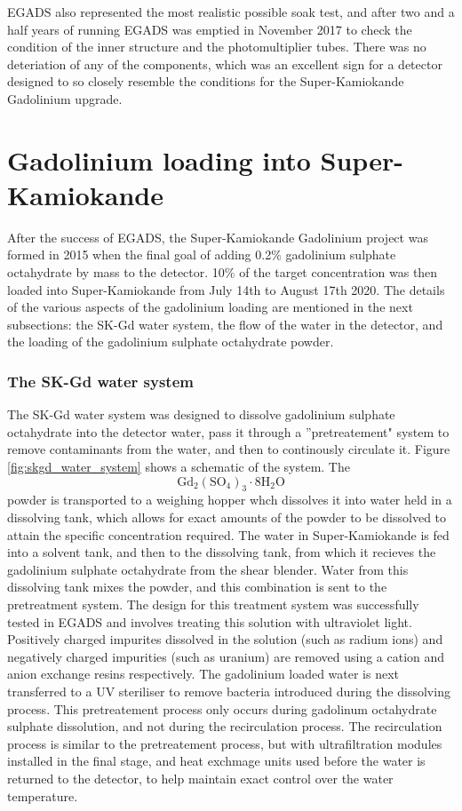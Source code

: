 EGADS also represented the most realistic possible soak test, and after two and a half years of running EGADS was emptied in November 2017 to check the condition of the inner structure and the photomultiplier tubes. There was no deteriation of any of the components, which was an excellent sign for a detector designed to so closely resemble the conditions for the Super-Kamiokande Gadolinium upgrade. 

\section{Gadolinium loading into Super-Kamiokande}

After the success of EGADS, the Super-Kamiokande Gadolinium project was formed in 2015 when the final goal of adding 0.2\% gadolinium sulphate octahydrate by mass to the detector. 10\% of the target concentration was then loaded into Super-Kamiokande from July 14th to August 17th 2020. The details of the various aspects of the gadolinium loading are mentioned in the next subsections: the SK-Gd water system, the flow of the water in the detector, and the loading of the gadolinium sulphate octahydrate powder.

\subsubsection{The SK-Gd water system}

The SK-Gd water system was designed to dissolve gadolinium sulphate octahydrate into the detector water, pass it through a ''pretreatement" system to remove contaminants from the water, and then to continously circulate it. Figure \ref{fig:skgd_water_system} shows a schematic of the system. The $$
\mathrm{Gd}_{2}\left(\mathrm{SO}_{4}\right)_{3} \cdot 8 \mathrm{H}_{2} \mathrm{O}
$$ powder is transported to a weighing hopper whch dissolves it into water held in a dissolving tank, which allows for exact amounts of the powder to be dissolved to attain the specific concentration required. The water in Super-Kamiokande is fed into a solvent tank, and then to the dissolving tank, from which it recieves the gadolinium sulphate octahydrate from the shear blender. Water from this dissolving tank mixes the powder, and this combination is sent to the pretreatment system. The design for this treatment system was successfully tested in EGADS and involves treating this solution with ultraviolet light. Positively charged impurites dissolved in the solution (such as radium ions) and negatively charged impurities (such as uranium) are removed using a cation and anion exchange resins respectively. The gadolinium loaded water is next transferred to a UV steriliser to remove bacteria introduced during the dissolving process. This pretreatement process only occurs during gadolinum octahydrate sulphate dissolution, and not during the recirculation process. The recirculation process is similar to the pretreatement process, but with ultrafiltration modules installed in the final stage, and heat exchmage units used before the water is returned to the detector, to help maintain exact control over the water temperature.

